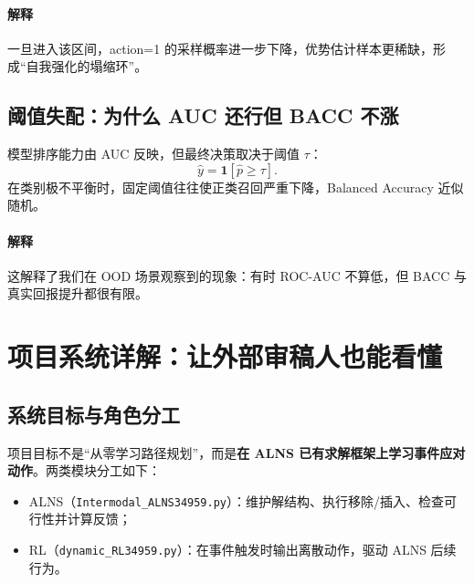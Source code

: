 ﻿\documentclass[11pt,a4paper]{ctexart}
\begin{document}
\paragraph{解释}
一旦进入该区间，action=1 的采样概率进一步下降，优势估计样本更稀缺，形成“自我强化的塌缩环”。

\subsection{阈值失配：为什么 AUC 还行但 BACC 不涨}
模型排序能力由 AUC 反映，但最终决策取决于阈值 $\tau$：
\begin{equation}
\hat y=\mathbf{1}[\hat p\ge \tau].
\end{equation}
在类别极不平衡时，固定阈值往往使正类召回严重下降，Balanced Accuracy 近似随机。

\paragraph{解释}
这解释了我们在 OOD 场景观察到的现象：有时 ROC-AUC 不算低，但 BACC 与真实回报提升都很有限。

\section{项目系统详解：让外部审稿人也能看懂}
\subsection{系统目标与角色分工}
项目目标不是“从零学习路径规划”，而是\textbf{在 ALNS 已有求解框架上学习事件应对动作}。两类模块分工如下：
\begin{itemize}
  \item ALNS（\texttt{Intermodal\_ALNS34959.py}）：维护解结构、执行移除/插入、检查可行性并计算反馈；
  \item RL（\texttt{dynamic\_RL34959.py}）：在事件触发时输出离散动作，驱动 ALNS 后续行为。
\end{itemize}
\end{document}
